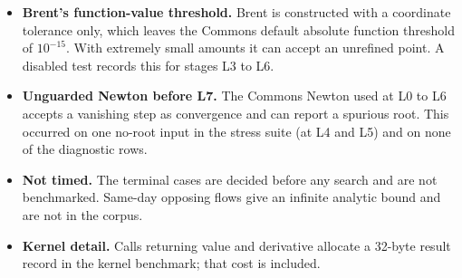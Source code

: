 \documentclass[a4paper,11pt]{article}
\begin{document}
\begin{itemize}
\item \textbf{Brent's function-value threshold.} Brent is constructed with a coordinate tolerance only, which leaves the Commons default absolute function threshold of $10^{-15}$. With extremely small amounts it can accept an unrefined point. A disabled test records this for stages L3 to L6.
\item \textbf{Unguarded Newton before L7.} The Commons Newton used at L0 to L6 accepts a vanishing step as convergence and can report a spurious root. This occurred on one no-root input in the stress suite (at L4 and L5) and on none of the \DiagnosticRows{} diagnostic rows.
\item \textbf{Not timed.} The terminal cases are decided before any search and are not benchmarked. Same-day opposing flows give an infinite analytic bound and are not in the corpus.
\item \textbf{Kernel detail.} Calls returning value and derivative allocate a 32-byte result record in the kernel benchmark; that cost is included.
\end{itemize}
\end{document}

